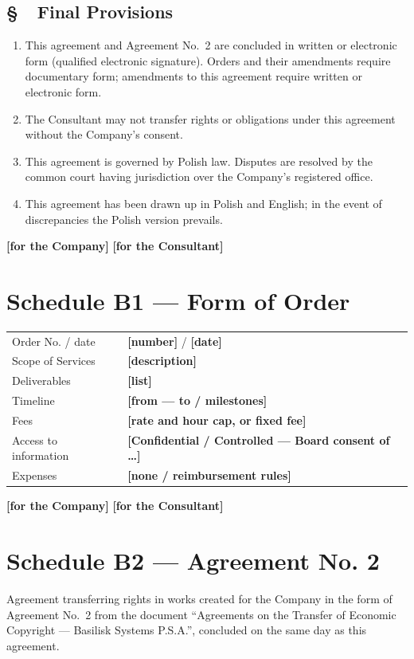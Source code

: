 \documentclass[11pt,a4paper]{report}
\newcounter{paragraf}
\newcommand{\paragraf}[1]{%
  \refstepcounter{paragraf}%
  \Needspace{5\baselineskip}%
  \subsection*{\S~\theparagraf\ #1}%
}
\newenvironment{ContractClause}[1]{\paragraf{#1}}{\par}
\newcommand{\field}[1]{\textbf{[#1]}}
\begin{document}
\begin{ContractClause}{Final Provisions}
\begin{enumerate}
  \item This agreement and Agreement No.~2 are concluded in written or electronic form (qualified electronic signature). Orders and their amendments require documentary form; amendments to this agreement require written or electronic form.
  \item The Consultant may not transfer rights or obligations under this agreement without the Company's consent.
  \item This agreement is governed by Polish law. Disputes are resolved by the common court having jurisdiction over the Company's registered office.
  \item This agreement has been drawn up in Polish and English; in the event of discrepancies the Polish version prevails.
\end{enumerate}
\end{ContractClause}

\vspace{1em}
\field{for the Company} \hfill \field{for the Consultant}

\section*{Schedule B1 --- Form of Order}
\begin{center}
\begin{tabularx}{\linewidth}{@{}p{4.2cm} X@{}}
\toprule
Order No. / date & \field{number} / \field{date} \\
Scope of Services & \field{description} \\
Deliverables & \field{list} \\
Timeline & \field{from --- to / milestones} \\
Fees & \field{rate and hour cap, or fixed fee} \\
Access to information & \field{Confidential / Controlled --- Board consent of \ldots} \\
Expenses & \field{none / reimbursement rules} \\
\bottomrule
\end{tabularx}
\end{center}
\field{for the Company} \hfill \field{for the Consultant}

\section*{Schedule B2 --- Agreement No. 2}
Agreement transferring rights in works created for the Company in the form of Agreement No.~2 from the document ``Agreements on the Transfer of Economic Copyright --- Basilisk Systems P.S.A.'', concluded on the same day as this agreement.
\end{document}
